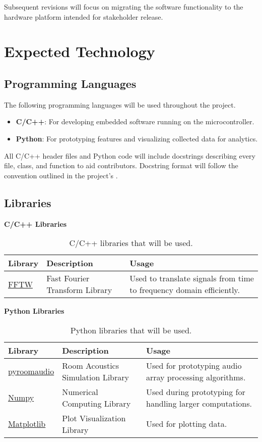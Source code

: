 \documentclass{article}
\begin{document}
Subsequent revisions will focus on migrating the software functionality to the
hardware platform intended for stakeholder release. 

\section{Expected Technology}

\subsection{Programming Languages}
The following programming languages will be used throughout the project.
\begin{itemize}
  \item \textbf{C/C++}: For developing embedded software running on the
  microcontroller.
  \item \textbf{Python}: For prototyping features and visualizing collected data
  for analytics.
\end{itemize}

All C/C++ header files and Python code will include docstrings describing every
file, class, and function to aid contributors. Docstring format will follow the
convention outlined in the project's .

\subsection{Libraries}

\textbf{C/C++ Libraries}
\begin{table}[h!]
\centering
\begin{tabularx}{\textwidth}{|l|X|X|}
\hline
\textbf{Library} & \textbf{Description} & \textbf{Usage} \\ \hline
\href{https://www.fftw.org/}{FFTW} & Fast Fourier Transform Library & Used to
translate signals from time to frequency domain efficiently. \\ \hline
\end{tabularx}
\caption{C/C++ libraries that will be used.}
\end{table}

\textbf{Python Libraries}
\begin{table}[h!]
\centering
\begin{tabularx}{\textwidth}{|l|X|X|}
\hline
\textbf{Library} & \textbf{Description} & \textbf{Usage} \\ \hline
\href{https://pypi.org/project/pyroomacoustics/}{pyroomaudio} & Room Acoustics
Simulation Library  & Used for prototyping audio array processing algorithms. \\
\hline
\href{https://numpy.org/}{Numpy} & Numerical Computing Library  & Used during
prototyping for handling larger computations. \\ \hline
\href{https://matplotlib.org/}{Matplotlib} & Plot Visualization Library  & Used
for plotting data. \\ \hline
\end{tabularx}
\caption{Python libraries that will be used.}
\end{table}
\end{document}
